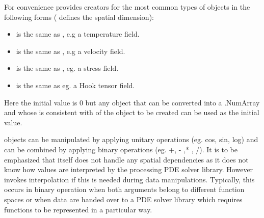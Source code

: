For convenience \escript provides creators for the most common types
of \Data objects in the following forms ( defines the 
spatial dimension):
\begin{itemize}
\item {} is the same as , 
e.g a temperature field. 
\item {}is the same as , e.g
a velocity field.   
\item {} is the same as ,
eg. a stress field.  
\item {} is the same as 
eg. a Hook tensor field.   
\end{itemize}
Here the initial value is $0$ but any object that can be converted into a \numarray.NumArray and whose \Shape
is consistent with \Shape of the \Data object to be created can be used as the initial value.

\Data objects can be manipulated by applying unitary operations (eg. cos, sin, log) 
and can be combined by applying binary operations (eg. +, - ,* , /). 
It is to be emphasized that \escript itself does not handle any spatial dependencies as 
it does not know how values are interpreted by the processing PDE solver library. 
However \escript invokes interpolation if this is needed during data manipulations. 
Typically, this occurs in binary operation when both arguments belong to different
function spaces or when data are handed over to a PDE solver library 
which requires functions to be represented in a particular way. 

